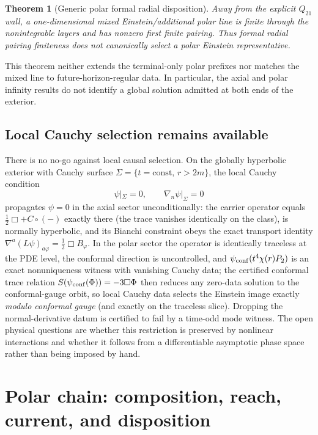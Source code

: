 \documentclass[11pt]{article}
\newtheorem{theorem}{Theorem}[section]
\theoremstyle{definition}
\theoremstyle{remark}
\begin{document}
\begin{theorem}[Generic polar formal radial disposition]
Away from the explicit \(Q_{21}\) wall, a one-dimensional mixed
Einstein/additional polar line is finite through the nonintegrable layers and
has nonzero first finite pairing.  Thus formal radial pairing finiteness does
not canonically select a polar Einstein representative.
\end{theorem}

This theorem neither extends the terminal-only polar prefixes nor matches the
mixed line to future-horizon-regular data.  In particular, the axial and
polar infinity results do not identify a global solution admitted at both
ends of the exterior.

\subsection{Local Cauchy selection remains available}

There is no no-go against local causal selection.  On the globally
hyperbolic exterior with
Cauchy surface \(\Sigma=\{t=\mathrm{const},\,r>2m\}\), the local Cauchy
condition
\begin{equation}
 \psi|_\Sigma=0,
 \qquad
 \nabla_n\psi|_\Sigma=0
\end{equation}
propagates \(\psi=0\) in the axial sector unconditionally: the carrier
operator equals \(\tfrac12\Box+C\!\circ\!(-)\) exactly there (the trace
vanishes identically on the class), is normally hyperbolic, and its
Bianchi constraint obeys the exact transport identity
\(\nabla^a(L\psi)_{a\varphi}=\tfrac12\Box B_\varphi\).  In the polar
sector the operator is identically traceless at the PDE level, the
conformal direction is uncontrolled, and
\(\psi_{\rm conf}(t^4\chi(r)P_2)\) is an exact nonuniqueness witness with
vanishing Cauchy data; the certified conformal trace relation
\(S(\psi_{\rm conf}(\Phi))=-3\Box\Phi\) then reduces any zero-data
solution to the conformal-gauge orbit, so local Cauchy data selects the
Einstein image exactly \emph{modulo conformal gauge} (and exactly on the
traceless slice).  Dropping the normal-derivative datum is certified to
fail by a time-odd mode witness.  The open physical questions are whether
this restriction is preserved by nonlinear interactions and whether it
follows from a differentiable asymptotic phase space rather than being
imposed by hand.

\section{Polar chain: composition, reach, current, and disposition}
\end{document}
